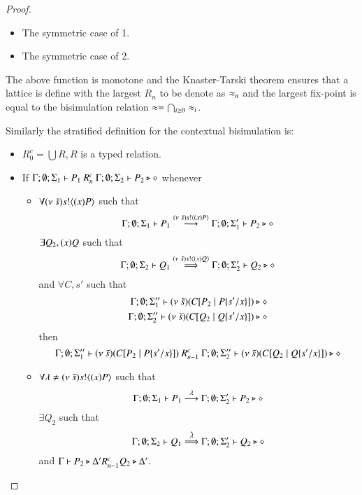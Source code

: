 \begin{proof}
\begin{itemize}
\begin{itemize}
				\item	The symmetric case of 1.
				\item	The symmetric case of 2.
			\end{itemize}
	\end{itemize}
	\noi The above function is monotone and the Knaster-Tarski theorem ensures that a lattice is define
	with the largest $R_n$ to be denote as $\approx_n$ and the largest fix-point is equal to the bisimulation relation $\approx = \bigcap_{i \geq 0} \approx_i$.

	Similarly the stratified definition for the contextual bisimulation is:

	\begin{itemize}
		\item	$R^c_0 = \bigcup R, R$ is a typed relation.
		\item	If $\Gamma; \emptyset; \Sigma_1 \vdash P_1\ R^c_n\ \Gamma; \emptyset; \Sigma_2 \vdash P_2 \triangleright \diamond$
			whenever
			\begin{itemize}
				\item	$\forall (\nu\ \tilde{s}) s ! \langle (x)P \rangle$ such that
					\[
						\Gamma; \emptyset; \Sigma_1 \vdash P_1 \stackrel{(\nu\ \tilde{s}) s ! \langle (x)P \rangle}{\longrightarrow} \Gamma; \emptyset; \Sigma_1' \vdash P_2 \triangleright \diamond
					\]
					$\exists Q_2, (x)Q$ such that
					\[
						\Gamma; \emptyset; \Sigma_2 \vdash Q_1 \stackrel{(\nu\ \tilde{s}) s ! \langle (x)Q \rangle}{\Longrightarrow} \Gamma; \emptyset; \Sigma_2' \vdash Q_2 \triangleright \diamond
					\]
					and $\forall C, s'$
					such that
					\begin{eqnarray*}
						\Gamma; \emptyset; \Sigma_1'' \vdash (\nu\ \tilde{s})(C[P_2 \;|\; P \{s'/x \}]) \triangleright \diamond \\
						\Gamma; \emptyset; \Sigma_2'' \vdash (\nu\ \tilde{s})(C[Q_2 \;|\; Q \{s'/x \}]) \triangleright \diamond
					\end{eqnarray*}
					then
					\[
						\Gamma; \emptyset; \Sigma_1'' \proves \newsp{\tilde{s}}{\context{C}{P_2 \Par P \subst{s'}{x}}}\ R^c_{n-1}\ 
						\Gamma; \emptyset; \Sigma_2'' \proves \newsp{\tilde{s}}{\context{C}{Q_2 \Par Q \subst{s'}{x}}} \hastype \Proc
					\]

				\item	$\forall \lambda \not= (\nu\ \tilde{s}) s ! \langle (x)P \rangle$ such that
					\[
						\Gamma; \emptyset; \Sigma_1 \vdash P_1 \stackrel{\lambda}{\longrightarrow} \Gamma; \emptyset; \Sigma_2'\vdash P_2 \triangleright \diamond
					\]
					$\exists Q_2$ such that 
					\[
						\Gamma; \emptyset; \Sigma_2 \vdash Q_1 \stackrel{\hat{\lambda}}{\Longrightarrow} \Gamma; \emptyset; \Sigma_2' \vdash Q_2 \triangleright \diamond
					\]
					and
					$\Gamma \vdash P_2 \triangleright \Delta' R^c_{n-1} Q_2 \triangleright \Delta'$.


\end{itemize}
\end{itemize}
\end{proof}
